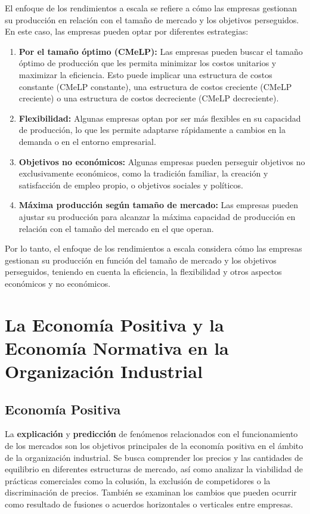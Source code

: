 \documentclass[
  doc,
  floatsintext,
  longtable,
  a4paper,
  nolmodern,
  notxfonts,
  notimes,
  12pt,
  colorlinks=true,linkcolor=blue,citecolor=blue,urlcolor=blue]{apa7}
\begin{document}
El enfoque de los rendimientos a escala se refiere a cómo las empresas
gestionan su producción en relación con el tamaño de mercado y los
objetivos perseguidos. En este caso, las empresas pueden optar por
diferentes estrategias:

\begin{enumerate}
\def\labelenumi{\Alph{enumi})}
\item
  \textbf{Por el tamaño óptimo (CMeLP):} Las empresas pueden buscar el
  tamaño óptimo de producción que les permita minimizar los costos
  unitarios y maximizar la eficiencia. Esto puede implicar una
  estructura de costos constante (CMeLP constante), una estructura de
  costos creciente (CMeLP creciente) o una estructura de costos
  decreciente (CMeLP decreciente).
\item
  \textbf{Flexibilidad:} Algunas empresas optan por ser más flexibles en
  su capacidad de producción, lo que les permite adaptarse rápidamente a
  cambios en la demanda o en el entorno empresarial.
\item
  \textbf{Objetivos no económicos:} Algunas empresas pueden perseguir
  objetivos no exclusivamente económicos, como la tradición familiar, la
  creación y satisfacción de empleo propio, o objetivos sociales y
  políticos.
\item
  \textbf{Máxima producción según tamaño de mercado:} Las empresas
  pueden ajustar su producción para alcanzar la máxima capacidad de
  producción en relación con el tamaño del mercado en el que operan.
\end{enumerate}

Por lo tanto, el enfoque de los rendimientos a escala considera cómo las
empresas gestionan su producción en función del tamaño de mercado y los
objetivos perseguidos, teniendo en cuenta la eficiencia, la flexibilidad
y otros aspectos económicos y no económicos.

\section{La Economía Positiva y la Economía Normativa en la Organización
Industrial}\label{la-economuxeda-positiva-y-la-economuxeda-normativa-en-la-organizaciuxf3n-industrial}

\subsection{Economía Positiva}\label{economuxeda-positiva}

La \textbf{explicación} y \textbf{predicción} de fenómenos relacionados
con el funcionamiento de los mercados son los objetivos principales de
la economía positiva en el ámbito de la organización industrial. Se
busca comprender los precios y las cantidades de equilibrio en
diferentes estructuras de mercado, así como analizar la viabilidad de
prácticas comerciales como la colusión, la exclusión de competidores o
la discriminación de precios. También se examinan los cambios que pueden
ocurrir como resultado de fusiones o acuerdos horizontales o verticales
entre empresas.
\end{document}
